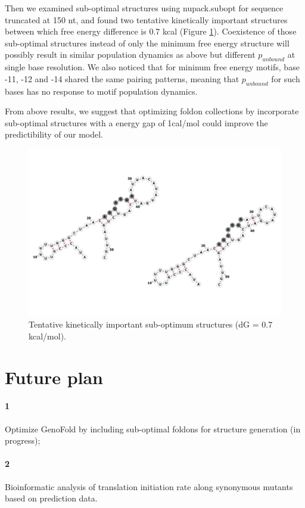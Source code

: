 \documentclass[11pt, a4paper]{article}
\begin{document}
Then we examined sub-optimal structures using nupack.subopt for sequence truncated at 150 nt, and found two tentative kinetically important structures between which free energy difference is 0.7 kcal (Figure \ref{fig:excp}). Coexistence of those sub-optimal structures instead of only the minimum free energy structure will possibly result in similar population dynamics as above but different $p_{unbound}$ at single base resolution. We also noticed that for mininum free energy motifs, base -11, -12 and -14 shared the same pairing patterns, meaning that $p_{unbound}$ for such bases has no response to motif population dynamics.

From above results, we suggest that optimizing foldon collections by incorporate sub-optimal structures with a energy gap of 1cal/mol could improve the predictibility of our model.

\begin{figure}
\centering
\includegraphics[width=\linewidth]{folding_example_grey_compare.png}
\caption{Tentative kinetically important sub-optimum structures (dG = 0.7 kcal/mol).}
\label{fig:excp}
\end{figure}

\section{Future plan}
\paragraph{1} Optimize GenoFold by including sub-optimal foldons for structure generation (in progress);
\paragraph{2} Bioinformatic analysis of translation initiation rate along synonymous mutants based on prediction data.


\small


\end{document}

